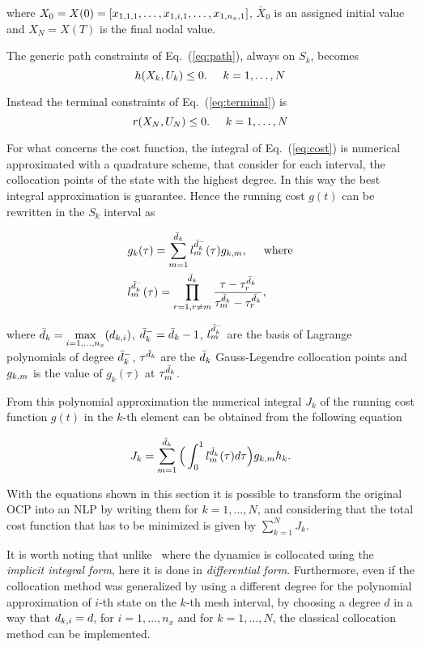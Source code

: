 where $X_0 = X(0) = [x_{1,1,1}, \dots, x_{1,i,1}, \dots, x_{1,n_{x},1}]$, $\bar{X}_{0}$ is an assigned initial value and $X_{N} = X(T)$ is the final nodal value.
 
 
The generic path constraints of Eq.~(\ref{eq:path}), always on $S_k$, becomes
\begin{equation}\label{eq:nlpath}
h(X_k, U_k) \leq 0. \hspace{5mm} k = 1, \dots, N
\end{equation}

Instead the terminal constraints of Eq.~(\ref{eq:terminal}) is
\begin{equation}\label{eq:npterminal}
	r(X_N, U_N) \leq 0. \hspace{5mm} k = 1, \dots, N
\end{equation}

For what concerns the cost function, the integral of Eq.~(\ref{eq:cost}) is numerical approximated with a quadrature scheme, that consider for each interval, the collocation points of the state with the highest degree. In this way the best integral approximation is guarantee. Hence the running cost $g(t)$ can be rewritten in the $S_k$ interval as

\begin{subequations}
	\begin{align}
	& g_k(\tau) = \sum_{m=1}^{\bar{d}_k} l_{m}^{\bar{d}_{k}^{-}}(\tau)g_{k,m}, \hspace{5mm} \text{where} \label{eq:nlpcost}\\
	&  l_{m}^{\bar{d}_{k}^{-}} (\tau) = \prod_{r=1, r\neq m}^{\bar{d}_k} \dfrac{\tau - \tau^{\bar{d}_{k}}_{r}}{\tau^{\bar{d}_{k}}_{m} - \tau^{\bar{d}_{k}}_{r}}, \label{eq:nlplm}
	\end{align}
\end{subequations}

where $\bar{d}_k = \max\limits_{i= 1, \dots, n_x}(d_{k,i})$, $\bar{d}_k^{-} = \bar{d}_k -1$, $l_{m}^{\bar{d}_{k}^{-}}$ are the basis of Lagrange polynomials of degree $\bar{d}_k^{-}$, $\tau^{\bar{d}_{k}}$ are the $\bar{d}_k$ Gauss-Legendre collocation points and $g_{k,m}$ is the value of $g_k (\tau)$ at $\tau^{\bar{d}_{k}}_{m}$.

From this polynomial approximation the numerical integral $J_k$ of the running cost function $g(t)$ in the $k$-th element can be obtained from the following equation

\begin{equation}\label{eq:nlpcostk}
	J_k = \sum_{m=1}^{\bar{d}_k}\Big(\int_{0}^{1}l_{m}^{\bar{d}_{k}}(\tau)d\tau\Big)g_{k,m} h_{k}.
\end{equation}

With the equations shown in this section it is possible to transform the original OCP into an NLP by writing them for $k = 1, \dots, N$, and considering that the total cost function that has to be minimized is given by $\sum_{k=1}^{N}J_k$.

It is worth noting that unlike~\cite{Patterson:OCAM:2015} where the dynamics is collocated using the \emph{implicit integral form}, here it is done in \emph{differential form}.
Furthermore, even if the collocation method was generalized by using a different degree for the polynomial approximation of $i$-th state on the $k$-th mesh interval, by choosing a degree $d$ in a way that $d_{k,i} = d$, for $i = 1, \dots, n_x$ and for $k = 1, \dots, N$, the classical collocation method can be implemented.
